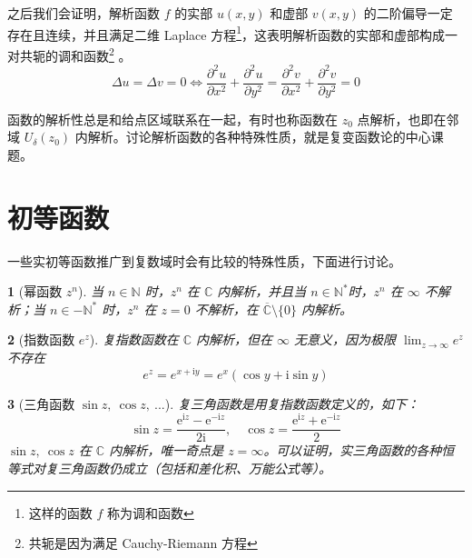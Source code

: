 \documentclass[UTF8]{report}
\def\N{\mathbb{N}}
\def\C{\mathbb{C}}
\theoremstyle{MyLineTheoremStyle} %
\theoremstyle{MyBlockTheoremStyle} %
\theoremstyle{MySubsubsectionStyle} %
\newtheorem{definition}{}
\begin{document}
    之后我们会证明，解析函数 $f$ 的实部 $u(x,y)$ 和虚部 $v(x,y)$ 的二阶偏导一定存在且连续，并且满足二维 Laplace 方程\footnote{这样的函数 $f$ 称为调和函数}，这表明解析函数的实部和虚部构成一对共轭的调和函数\footnote{共轭是因为满足 Cauchy-Riemann 方程}
    。
    \begin{equation}
        \Delta u = \Delta v = 0 \Longleftrightarrow
        \frac{\partial^{2}u}{\partial x^{2}}+\frac{\partial^{2}u}{\partial y^{2}}=\frac{\partial^{2}v}{\partial x^{2}}+\frac{\partial^{2}v}{\partial y^{2}}=0
    \end{equation}
    
    函数的解析性总是和给点区域联系在一起，有时也称函数在 $z_0$ 点解析，也即在邻域 $U_{\delta}(z_0)$ 内解析。讨论解析函数的各种特殊性质，就是复变函数论的中心课题。
    



\section{初等函数}

一些实初等函数推广到复数域时会有比较的特殊性质，下面进行讨论。



\begin{definition}[幂函数 $z^n$]
当 $n \in \N$ 时，$z^n$ 在 $\C$ 内解析，并且当 $n \in \N^*$时，$z^n$ 在 $\infty$ {\color{red} 不解析}；当 $n \in -\N^*$ 时，$z^n$ 在 $z=0$ {\color{red} 不解析}，在 $\overline{\C}\setminus \{0\}$ 内解析。
\end{definition}


\begin{definition}[指数函数 $e^z$]
复指数函数在 $\C$ 内解析，但在 $\infty$ 无意义，因为极限 $\lim_{z \to \infty}e^z$ 不存在
\begin{equation}
e^z = e^{x + \mathrm{i} y} = e^x(\cos y + \mathrm{i} \sin y)
\end{equation}
\end{definition}


\begin{definition}[三角函数 $\sin z,\ \cos z,\ ...$]
复三角函数是用复指数函数定义的，如下：
\begin{equation}
    \sin z=\frac{\mathrm{e}^{\mathrm{i}z}-\mathrm{e}^{-\mathrm{i}z}}{2\mathrm{i}},\quad\cos z=\frac{\mathrm{e}^{\mathrm{i}z}+\mathrm{e}^{-\mathrm{i}z}}{2}
\end{equation}
$\sin z,\ \cos z$ 在 $\C$ 内解析，唯一奇点是 $z = \infty$。可以证明，实三角函数的各种恒等式对复三角函数仍成立（包括和差化积、万能公式等）。
\end{definition}
\end{document}
